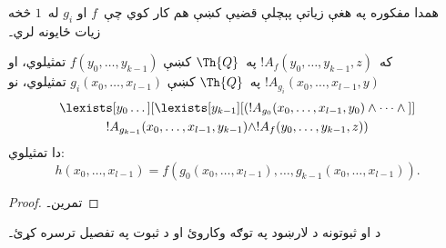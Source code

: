 \documentclass[../../../include/open-logic-section]{subfiles}
\begin{document}
همدا مفکوره په هغې زياتې پېچلې قضيې کښې هم کار کوي چې~$f$ او
$g_i$ له~$1$ څخه زيات ځایونه لري۔

\begin{prop}
که~$!A_f(y_0, \dots, y_{k-1}, z)$ په~$\Th{Q}$ کښې
$f(y_0, \dots, y_{k-1})$ تمثيلوي، او
$!A_{g_i}(x_0, \dots, x_{l-1}, y)$ په~$\Th{Q}$ کښې
$g_i(x_0, \dots, x_{l-1})$ تمثيلوي، نو
\begin{multline*}
  \lexists[y_0\dots][\lexists[y_{k-1}][(!A_{g_0}(x_0,\dots,x_{l-1},y_0) \land
      \dots \land {}]]\\
  !A_{g_{k-1}}(x_0,\dots,x_{l-1},y_{k-1}) \land !A_f(y_0,\dots,y_{k-1},z))
\end{multline*}
دا تمثيلوي:
\[
h(x_0, \dots, x_{l-1}) = f(g_0(x_0, \dots, x_{l-1}), \dots, g_{k-1}(x_0,
\dots, x_{l-1})).
\]
\end{prop}

\begin{proof}
تمرین۔
\end{proof}

\begin{prob}
د  او
 ثبوتونه د لارښود په توګه وکاروئ او
د  ثبوت په تفصيل ترسره
کړئ۔
\end{prob}
\end{document}
